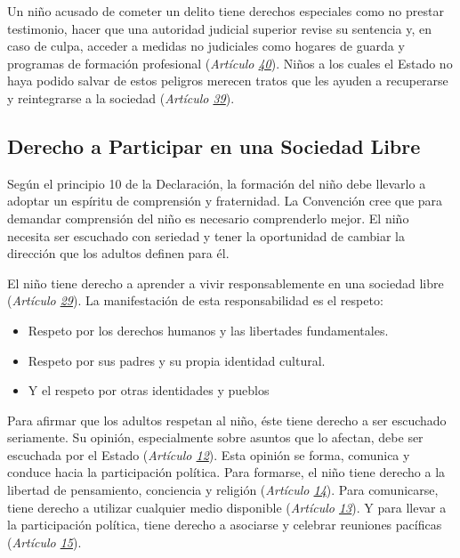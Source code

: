 \documentclass{tufte-handout}
\begin{document}
Un niño acusado de cometer un delito tiene derechos especiales como no prestar testimonio, hacer que una autoridad judicial superior revise su sentencia y, en caso de culpa, acceder a medidas no judiciales como hogares de guarda y programas de formación profesional (\textit{Artículo \href{https://procosi.github.io/nenes/convencion/?a=40}{40}}). Niños a los cuales el Estado no haya podido salvar de estos peligros merecen tratos que les ayuden a recuperarse y reintegrarse a la sociedad (\textit{Artículo \href{https://procosi.github.io/nenes/convencion/?a=39}{39}}).

\subsection{Derecho a Participar en una Sociedad Libre}\label{subsec:participar}


Según el principio 10 de la Declaración, la formación del niño debe llevarlo a adoptar un espíritu de comprensión y fraternidad. La Convención cree que para demandar comprensión del niño es necesario comprenderlo mejor. El niño necesita ser escuchado con seriedad y tener la oportunidad de cambiar la dirección que los adultos definen para él.

El niño tiene derecho a aprender a vivir responsablemente en una sociedad libre (\textit{Artículo \href{https://procosi.github.io/nenes/convencion/?a=29}{29}}). La manifestación de esta responsabilidad es el respeto:

\begin{itemize}
\item{Respeto por los derechos humanos y las libertades fundamentales.}
\item{Respeto por sus padres y su propia identidad cultural.}
\item{Y el respeto por otras identidades y pueblos}
\end{itemize}

Para afirmar que los adultos respetan al niño, éste tiene derecho a ser escuchado seriamente. Su opinión, especialmente sobre asuntos que lo afectan, debe ser escuchada por el Estado (\textit{Artículo \href{https://procosi.github.io/nenes/convencion/?a=12}{12}}). Esta opinión se forma, comunica y conduce hacia la participación política. Para formarse, el niño tiene derecho a la libertad de pensamiento, conciencia y religión (\textit{Artículo \href{https://procosi.github.io/nenes/convencion/?a=14}{14}}). Para comunicarse, tiene derecho a utilizar cualquier medio disponible (\textit{Artículo \href{https://procosi.github.io/nenes/convencion/?a=13}{13}}). Y para llevar a la participación política, tiene derecho a asociarse y celebrar reuniones pacíficas (\textit{Artículo \href{https://procosi.github.io/nenes/convencion/?a=15}{15}}).
\end{document}
